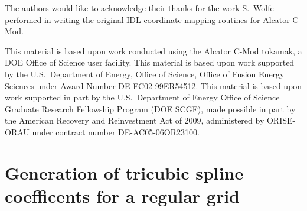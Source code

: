 \documentclass[12pt,floatfix,showpacs]{revtex4-1}
\begin{document}
\begin{acknowledgements}
The authors would like to acknowledge their thanks for the work S.~Wolfe performed in writing the original IDL coordinate mapping routines for Alcator C-Mod.

This material is based upon work conducted using the Alcator C-Mod tokamak, a DOE Office of Science user facility.
This material is based upon work supported by the U.S.\ Department of Energy, Office of Science, Office of Fusion Energy Sciences under Award Number DE-FC02-99ER54512.
This material is based upon work supported in part by the U.S.\ Department of Energy Office of Science Graduate Research Fellowship Program (DOE SCGF), made possible in part by the American Recovery and Reinvestment Act of 2009, administered by ORISE-ORAU under contract number DE-AC05-06OR23100.

\end{acknowledgements}

\appendix
\section{Generation of tricubic spline coefficents for a regular grid}\label{sec:App}
\end{document}
